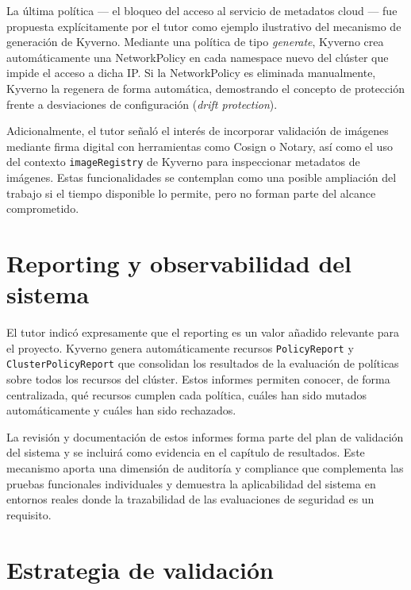 La última política — el bloqueo del acceso al servicio de metadatos cloud — fue propuesta explícitamente por el tutor como ejemplo ilustrativo del mecanismo de generación de Kyverno. Mediante una política de tipo \textit{generate}, Kyverno crea automáticamente una NetworkPolicy en cada namespace nuevo del clúster que impide el acceso a dicha IP. Si la NetworkPolicy es eliminada manualmente, Kyverno la regenera de forma automática, demostrando el concepto de protección frente a desviaciones de configuración (\textit{drift protection}).

Adicionalmente, el tutor señaló el interés de incorporar validación de imágenes mediante firma digital con herramientas como Cosign o Notary, así como el uso del contexto \texttt{imageRegistry} de Kyverno para inspeccionar metadatos de imágenes. Estas funcionalidades se contemplan como una posible ampliación del trabajo si el tiempo disponible lo permite, pero no forman parte del alcance comprometido.

\section{Reporting y observabilidad del sistema}

El tutor indicó expresamente que el reporting es un valor añadido relevante para el proyecto. Kyverno genera automáticamente recursos \texttt{PolicyReport} y \texttt{ClusterPolicyReport} que consolidan los resultados de la evaluación de políticas sobre todos los recursos del clúster. Estos informes permiten conocer, de forma centralizada, qué recursos cumplen cada política, cuáles han sido mutados automáticamente y cuáles han sido rechazados.

La revisión y documentación de estos informes forma parte del plan de validación del sistema y se incluirá como evidencia en el capítulo de resultados. Este mecanismo aporta una dimensión de auditoría y compliance que complementa las pruebas funcionales individuales y demuestra la aplicabilidad del sistema en entornos reales donde la trazabilidad de las evaluaciones de seguridad es un requisito.

\section{Estrategia de validación}

